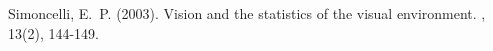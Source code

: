 \documentclass[twoside]{article}
\begin{document}
\begin{multicols}{2}
\begin{thebibliography}{99}
Simoncelli, E.~P. (2003).
\newblock  Vision and the statistics of the visual environment.
, 13(2), 144-149.
 
\end{thebibliography}



\end{multicols}
\end{document}
